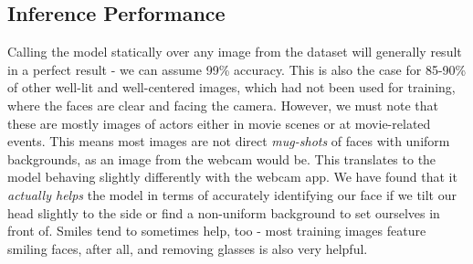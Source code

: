 \subsection{Inference Performance}
Calling the model statically over any image from the dataset will generally result in a perfect result - we can assume 99\% accuracy. This is also the case for 85-90\% of other well-lit and well-centered images, which had not been used for training, where the faces are clear and facing the camera. However, we must note that these are mostly images of actors either in movie scenes or at movie-related events. This means most images are not direct \textit{mug-shots} of faces with uniform backgrounds, as an image from the webcam would be. This translates to the model behaving slightly differently with the webcam app. We have found that it \textit{actually helps} the model in terms of accurately identifying our face if we tilt our head slightly to the side or find a non-uniform background to set ourselves in front of. Smiles tend to sometimes help, too - most training images feature smiling faces, after all, and removing glasses is also very helpful. 
